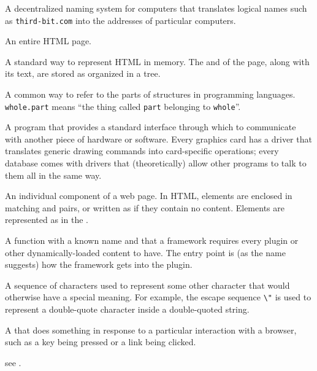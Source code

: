 \begin{description}
A decentralized naming system for computers that translates logical names such
as \texttt{third-bit.com} into the addresses of particular computers.

An entire HTML page.

A standard way to represent HTML in memory. The  and
 of the page, along with its text, are stored as
 organized in a tree.

A common way to refer to the parts of structures in programming languages.
\texttt{whole.part} means ``the thing called \texttt{part} belonging to \texttt{whole}''.

A program that provides a standard interface through which to communicate with
another piece of hardware or software. Every graphics card has a driver that
translates generic drawing commands into card-specific operations; every
database comes with drivers that (theoretically) allow other programs to talk
to them all in the same way.

An individual component of a web page. In HTML, elements are enclosed in
matching \texttt{} and \texttt{} pairs,
or written as \texttt{} if they contain no content.
Elements are represented as  in the .

A function with a known name and  that a framework
requires every plugin or other dynamically-loaded content to have. The entry
point is (as the name suggests) how the framework gets into the plugin.

A sequence of characters used to represent some other character that would
otherwise have a special meaning. For example, the escape sequence \texttt{\textbackslash{}"} is
used to represent a double-quote character inside a double-quoted string.

A  that does something in response to
a particular interaction with a browser, such as a key being pressed or a link
being clicked.

see .


\end{description}
